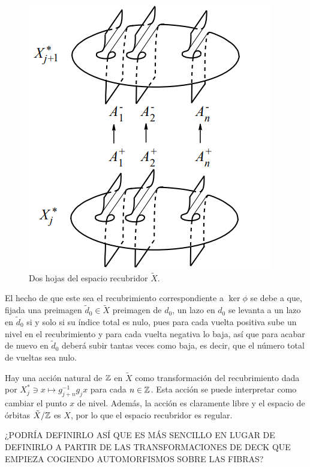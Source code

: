\documentclass[TFG.tex]{subfiles}
\begin{document}

\begin{figure}[h!]
\includegraphics[scale=0.6]{Imagenes/recubrimiento}
\caption{Dos hojas del espacio recubridor $\tilde{X}$.}\label{recubrimiento}
\end{figure}

El hecho de que este sea el recubrimiento correspondiente a $\ker\phi$ se debe a que, fijada una preimagen $\tilde{d}_0\in\tilde{X}$ preimagen de $d_0$, un lazo en $d_0$ se levanta a un lazo en $\tilde{d}_0$ si y solo si su índice total es nulo, pues para cada vuelta positiva sube un nivel en el recubrimiento y para cada vuelta negativa lo baja, así que para acabar de nuevo en $\tilde{d}_0$ deberá subir tantas veces como baja, es decir, que el número total de vueltas sea nulo.

Hay una acción natural de $\mathbb{Z}$ en $\tilde{X}$ como transformación del recubrimiento dada por $X^*_j\ni x\mapsto g_{j+n}^{-1}g_jx$ para cada $n\in\mathbb{Z}$. Esta acción se puede interpretar como cambiar el punto $x$ de nivel. Además, la acción es claramente libre y el espacio de órbitas $\tilde{X}/\mathbb{Z}$ es $X$, por lo que el espacio recubridor es regular.


¿PODRÍA DEFINIRLO ASÍ QUE ES MÁS SENCILLO EN LUGAR DE DEFINIRLO A PARTIR DE LAS TRANSFORMACIONES DE DECK QUE EMPIEZA COGIENDO AUTOMORFISMOS SOBRE LAS FIBRAS?

\end{document}
